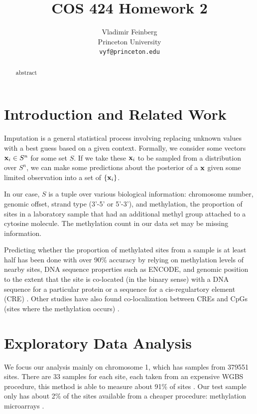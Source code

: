 \documentclass{article} %
\title{COS 424 Homework 2}
\author{
Vladimir Feinberg\\
Princeton University\\
\texttt{vyf@princeton.edu}
}
\begin{document}
\maketitle

\begin{abstract}
abstract
\end{abstract}

\section{Introduction and Related Work}

Imputation is a general statistical process involving replacing unknown values with a best guess based on a given context. Formally, we consider some vectors $\textbf{x}_i\in S^n$ for some set $S$. If we take these $\textbf{x}_i$ to be sampled from a distribution over $S^n$, we can make some predictions about the posterior of a $\textbf{x}$ given some limited observation into a set of $\{\textbf{x}_i\}$.

In our case, $S$ is a tuple over various biological information: chromosome number, genomic offset, strand type (3'-5' or 5'-3'), and methylation, the proportion of sites in a laboratory sample that had an additional methyl group attached to a cytosine molecule. The methylation count in our data set may be missing information.

Predicting whether the proportion of methylated sites from a sample is at least half has been done with over 90\% accuracy by relying on methylation levels of nearby sites, DNA sequence properties such as ENCODE, and genomic position to the extent that the site is co-located (in the binary sense) with a DNA sequence for a particular protein or a sequence for a cis-regulartory element (CRE) \cite{zhang2015predicting}. Other studies have also found co-localization between CREs and CpGs (sites where the methylation occurs) \cite{ziller2013charting}.

\section{Exploratory Data Analysis}

We focus our analysis mainly on chromosome 1, which has samples from 379551 sites. There are 33 samples for each site, each taken from an expensive WGBS procedure, this method is able to measure about 91\% of sites \cite{laird2010principles}. Our test sample only has about 2\% of the sites available from a cheaper procedure: methylation microarrays \cite{zhang2015predicting}.
\end{document}
